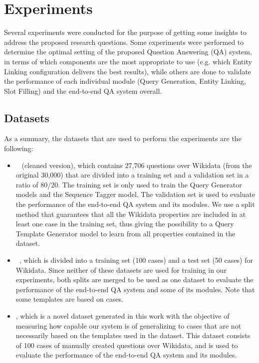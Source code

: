 \section{Experiments}
\label{cap4:experimentalDesign/experiments}
Several experiments were conducted for the purpose of getting some insights to address the 
proposed research questions. Some experiments were performed to determine the optimal setting of 
the proposed Question Answering (QA) system, in terms of which components are the most 
appropriate to use (e.g. which Entity Linking configuration delivers the best results), while others 
are done to validate the performance of each individual module (Query Generation, Entity Linking, Slot 
Filling) and the end-to-end QA system overall.

\subsection{Datasets}
\label{cap4:experimentalDesign/datasets}
As a summary, the datasets that are used to perform the experiments are the following:

\begin{itemize}
    \item \LCQuADtwo{}~\cite{dataset:lcquad2-DubeyBA019} (cleaned version), which contains 27,706 
    questions over Wikidata (from the original 30,000) that are divided into a training set and 
    a validation set in a ratio of 80/20. The training set is only used to train the Query 
    Generator models and the Sequence Tagger model. The validation set is used to evaluate the 
    performance of the end-to-end QA system and its modules. We use a split method that 
    guarantees that all the Wikidata properties are included in at least one case in the 
    training set, thus giving the possibility to a Query Template Generator model to learn from 
    all properties contained in the dataset.
    \item \QALDseven{}~\cite{dataset:qald7-UsbeckNHKRN17}, which is divided into a training set (100 
    cases) and a test set (50 cases) for Wikidata. Since neither of these datasets are used for 
    training in our experiments, both splits are merged to be used as one dataset to evaluate 
    the performance of the end-to-end QA system and some of its modules. Note that some \LCQuADtwo{} 
    templates are based on \QALDseven{} cases.
    \item \WikiSPARQL{}, which is a novel dataset generated in this work with the objective of 
    measuring how capable our system is of generalizing to cases that are not necessarily based on 
    the templates used in the \LCQuADtwo{} dataset. This dataset consists of 100 cases of manually 
    created questions over Wikidata, and is used to evaluate the performance of the end-to-end 
    QA system and its modules.
\end{itemize}

